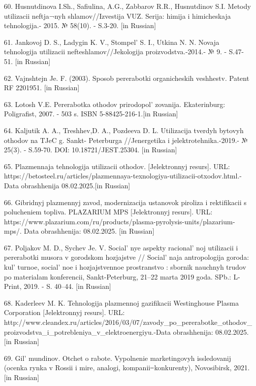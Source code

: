 \begin{references}
60. Husnutdinova I.Sh., Safiulina, A.G., Zabbarov R.R., Husnutdinov S.I.
Metody utilizacii neftja¬nyh shlamov//Izvestija VUZ. Serija: himija i
himicheskaja tehnologija.- 2015. № 58(10). - S.3-20. {[}in Russian{]}

61. Jankovoj D. S., Ladygin K. V., Stompel'{} S. I.,
Utkina N. N. Novaja tehnologija utilizacii nefteshlamov//Jekologija
proizvodstva.-2014.- № 9. - S.47-51. {[}in Russian{]}

62. Vajnshtejn Je. F. (2003). Sposob pererabotki organicheskih
veshhestv. Patent RF 2201951. {[}in Russian{]}

63. Lotosh V.E. Pererabotka othodov prirodopol' zovanija.
Ekaterinburg: Poligrafist, 2007. - 503 s. ISBN 5-88425-216-1.{[}in
Russian{]}

64. Kaljutik A. A., Treshhev,D. A., Pozdeeva D. L. Utilizacija tverdyh
bytovyh othodov na TJeC g. Sankt- Peterburga //Jenergetika i
jelektrotehnika.-2019.- № 25(3). - S.59-70. DOI: 10.18721/JEST.25304.
{[}in Russian{]}

65. Plazmennaja tehnologija utilizacii othodov. {[}Jelektronnyj
resurs{]}. URL:
https://betosteel.ru/articles/plazmennaya-texnologiya-utilizacii-otxodov.html.-
Data obrashhenija 08.02.2025.{[}in Russian{]}

66. Gibridnyj plazmennyj zavod, modernizacija ustanovok piroliza i
rektifikacii s polucheniem topliva. PLAZARIUM MPS {[}Jelektronnyj
resurs{]}. URL:
https://www.plazarium.com/ru/products/plasma-pyrolysis-units/plazarium-mps/.
Data obrashhenija: 08.02.2025. {[}in Russian{]}

67. Poljakov M. D., Sychev Je. V. Social' nye aspekty
racional' noj utilizacii i pererabotki musora v gorodskom
hozjajstve // Social' naja antropologija goroda:
kul' turnoe, social' noe i hozjajstvennoe
prostranstvo : sbornik nauchnyh trudov po materialam konferencii,
Sankt-Peterburg, 21--22 marta 2019 goda. SPb.: L-Print, 2019. - S.
40--44. {[}in Russian{]}

68. Kaderleev M. K. Tehnologija plazmennoj gazifikacii Westinghouse
Plasma Corporation {[}Jelektronnyj resurs{]}. URL:
http://www.cleandex.ru/articles/2016/03/07/zavody\_po\_pererabotke\_othodov\_proizvodstva\_i\_potrebleniya\_v\_elektroenergiyu.-Data
obrashhenija: 08.02.2025. {[}in Russian{]}

69. Gil' mundinov. Otchet o rabote. Vypolnenie
marketingovyh issledovanij (ocenka rynka v Rossii i mire, analogi,
kompanii ̶ konkurenty), Novosibirsk, 2021. {[}in Russian{]}
\end{references}

